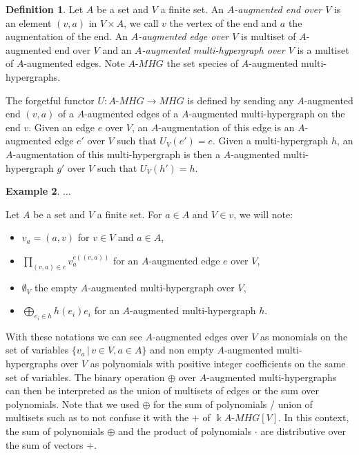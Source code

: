 \documentclass[a4paper]{article}
\theoremstyle{definition}
\newtheorem{definition}{Definition}
\newtheorem{example}[definition]{Example}
\begin{document}
\begin{definition}
Let $A$ be a set and $V$ a finite set. An \textit{$A$-augmented end over $V$} is an element $(v,a)$ in $V\times A$, we call $v$ the vertex of the end and $a$ the augmentation of the end. An \textit{$A$-augmented edge over $V$} is multiset of $A$-augmented end over $V$ and an \textit{$A$-augmented multi-hypergraph over $V$} is a multiset of $A$-augmented edges. Note $A\text{-}MHG$ the set species of $A$-augmented multi-hypergraphs.
\end{definition}


The forgetful functor $U:A\text{-}MHG \rightarrow MHG$ is defined by sending any $A$-augmented end $(v,a)$ of a $A$-augmented edges of a $A$-augmented multi-hypergraph on the end $v$. Given an edge $e$ over $V$, an $A$-augmentation of this edge is an $A$-augmented edge $e'$ over $V$ such that $U_V(e') = e$. Given a multi-hypergraph $h$, an $A$-augmentation of this multi-hypergraph is then a $A$-augmented multi-hypergraph $g'$ over $V$ such that $U_V(h') = h$.

\begin{example}
...
\end{example}

Let $A$ be a set and $V$ a finite set. For $a\in A$ and $V\in v$, we will note:
\begin{itemize}
\item $v_a = (a,v)$ for $v\in V$ and $a\in A$,
\item $\prod_{(v,a)\in e} v_a^{e((v,a))}$ for an $A$-augmented edge $e$ over $V$,
\item $\emptyset_V$ the empty $A$-augmented multi-hypergraph over $V$,
\item $\bigoplus_{e_i\in h}h(e_i)e_i$ for an $A$-augmented multi-hypergraph $h$.
\end{itemize}
With these notations we can see $A$-augmented edges over $V$ as monomials on the set of variables $\{v_a\,|\, v\in V,  a\in A\}$ and non empty $A$-augmented multi-hypergraphs over $V$ as polynomials with positive integer coefficients on the same set of variables. The binary operation $\oplus$ over $A$-augmented multi-hypergraphs can then be interpreted as the union of multisets of edges or the sum over polynomials. Note that we used $\oplus$ for the sum of polynomials / union of multisets such as to not confuse it with the $+$ of $\Bbbk A\text{-}MHG[V]$. In this context, the sum of polynomials $\oplus$ and the product of polynomials $\cdot$ are distributive over the sum of vectors $+$.
\end{document}
